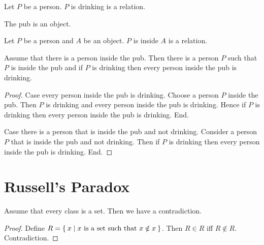 \documentclass{article}
\begin{document}
  \begin{forthel}
    \begin{signature}
      Let $P$ be a person.
      $P$ is drinking is a relation.
    \end{signature}

    \begin{signature}
      The pub is an object.
    \end{signature}

    \begin{signature}
      Let $P$ be a person and $A$ be an object.
      $P$ is inside $A$ is a relation.
    \end{signature}

    \begin{theorem}
      Assume that there is a person inside the pub.
      Then there is a person $P$ such that $P$ is inside the pub and if $P$ is
      drinking then every person inside the pub is drinking.
    \end{theorem}
    \begin{proof}
      Case every person inside the pub is drinking.
        Choose a person $P$ inside the pub.
        Then $P$ is drinking and every person inside the pub is drinking.
        Hence if $P$ is drinking then every person inside the pub is drinking.
      End.

      Case there is a person that is inside the pub and not drinking.
        Consider a person $P$ that is inside the pub and not drinking.
        Then if $P$ is drinking then every person inside the pub is drinking.
      End.
    \end{proof}
  \end{forthel}


  \section*{Russell's Paradox}

  \begin{forthel}
    \begin{theorem}
      Assume that every class is a set.
      Then we have a contradiction.
    \end{theorem}
    \begin{proof}
      Define $R = \Set{x | \text{$x$ is a set such that $x \notin x$}}$.
      Then $R \in R$ iff $R \notin R$.
      Contradiction.
    \end{proof}
  \end{forthel}
\end{document}
